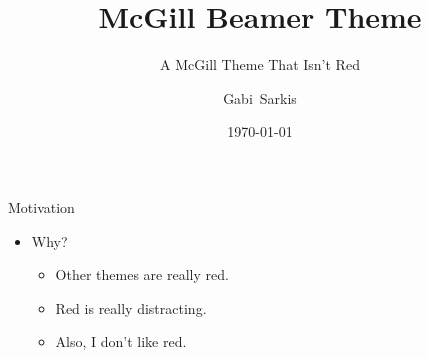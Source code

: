 \documentclass[table]{beamer}
\title[McGill Theme]{McGill Beamer Theme}
\subtitle[]{A McGill Theme That Isn't Red}
\author[G. Sarkis]{Gabi~Sarkis}
\institute[McGill University]
{
  \inst{}%
  McGill University, Montr\'{e}al, QC.
}
\date[]{\today}
\begin{document}
\frame[plain]{
  \titlepage
}

\begin{frame}{Motivation}

  \begin{itemize}
  \item[] Why?

    \begin{itemize}
    \item Other themes are really red.
    \item Red is really distracting.
    \item Also, I don't like red.
    \end{itemize}
  \end{itemize}

\end{frame}

\frame[plain]{

  \centering
  \color{titlecolor}{\Large Thank you!}

}
\end{document}
